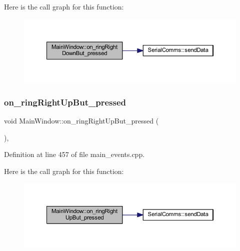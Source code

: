 Here is the call graph for this function\+:
\nopagebreak
\begin{figure}[H]
\begin{center}
\leavevmode
\includegraphics[width=350pt]{classMainWindow_a2a0d4d64e7fe2ee99abce8e41eb4afd1_cgraph}
\end{center}
\end{figure}
\mbox{\label{classMainWindow_a91f17268d2e2d4ac1b10c37a535a93fe}} 
\subsubsection{\texorpdfstring{on\_ringRightUpBut\_pressed}{on\_ringRightUpBut\_pressed}}
{\footnotesize\ttfamily void Main\+Window\+::on\+\_\+ring\+Right\+Up\+But\+\_\+pressed (\begin{DoxyParamCaption}{ }\end{DoxyParamCaption})\hspace{0.3cm}{\ttfamily [private]}, {\ttfamily [slot]}}



Definition at line 457 of file main\+\_\+events.\+cpp.

Here is the call graph for this function\+:
\nopagebreak
\begin{figure}[H]
\begin{center}
\leavevmode
\includegraphics[width=350pt]{classMainWindow_a91f17268d2e2d4ac1b10c37a535a93fe_cgraph}
\end{center}
\end{figure}
\mbox{\label{classMainWindow_aa663ee1d7e10715e4998923eb87e5d15}} 
